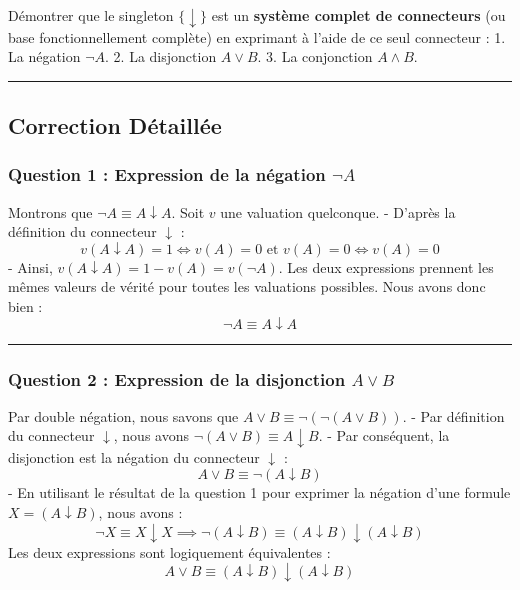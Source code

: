 \documentclass[11pt,a4paper]{article}
\begin{document}
Démontrer que le singleton \(\{\downarrow\}\) est un \textbf{système
complet de connecteurs} (ou base fonctionnellement complète) en
exprimant à l'aide de ce seul connecteur : 1. La négation \(\neg A\). 2.
La disjonction \(A \lor B\). 3. La conjonction \(A \land B\).

\begin{center}\rule{0.5\linewidth}{0.5pt}\end{center}

\hypertarget{correction-duxe9tailluxe9e}{%
\subsection{Correction Détaillée}\label{correction-duxe9tailluxe9e}}

\hypertarget{question-1-expression-de-la-nuxe9gation-neg-a}{%
\subsubsection{\texorpdfstring{Question 1 : Expression de la négation
\(\neg A\)}{Question 1 : Expression de la négation \textbackslash neg A}}\label{question-1-expression-de-la-nuxe9gation-neg-a}}

Montrons que \(\neg A \equiv A \downarrow A\). Soit \(v\) une valuation
quelconque. - D'après la définition du connecteur \(\downarrow\) :
\[v(A \downarrow A) = 1 \iff v(A) = 0 \text{ et } v(A) = 0 \iff v(A) = 0\]
- Ainsi, \(v(A \downarrow A) = 1 - v(A) = v(\neg A)\). Les deux
expressions prennent les mêmes valeurs de vérité pour toutes les
valuations possibles. Nous avons donc bien :
\[\neg A \equiv A \downarrow A\]

\begin{center}\rule{0.5\linewidth}{0.5pt}\end{center}

\hypertarget{question-2-expression-de-la-disjonction-a-lor-b}{%
\subsubsection{\texorpdfstring{Question 2 : Expression de la disjonction
\(A \lor B\)}{Question 2 : Expression de la disjonction A \textbackslash lor B}}\label{question-2-expression-de-la-disjonction-a-lor-b}}

Par double négation, nous savons que
\(A \lor B \equiv \neg(\neg(A \lor B))\). - Par définition du connecteur
\(\downarrow\), nous avons \(\neg(A \lor B) \equiv A \downarrow B\). -
Par conséquent, la disjonction est la négation du connecteur
\(\downarrow\) : \[A \lor B \equiv \neg(A \downarrow B)\] - En utilisant
le résultat de la question 1 pour exprimer la négation d'une formule
\(X = (A \downarrow B)\), nous avons :
\[\neg X \equiv X \downarrow X \implies \neg(A \downarrow B) \equiv (A \downarrow B) \downarrow (A \downarrow B)\]
Les deux expressions sont logiquement équivalentes :
\[A \lor B \equiv (A \downarrow B) \downarrow (A \downarrow B)\]
\end{document}
